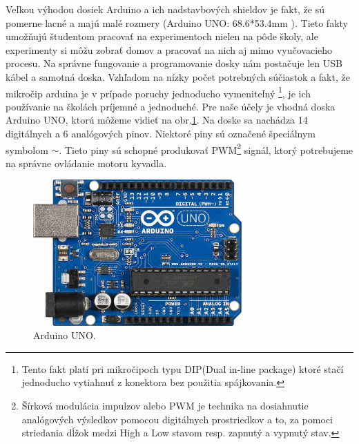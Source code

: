 \newpage
Veľkou výhodou dosiek Arduino a ich nadstavbových shieldov je fakt, že sú pomerne lacné a majú malé rozmery (Arduino UNO: 68.6*53.4mm\cite{UNO} ). Tieto fakty umožňujú študentom pracovať na experimentoch nielen na pôde školy, ale experimenty si môžu zobrať domov a pracovať na nich aj mimo vyučovacieho procesu. Na správne fungovanie a programovanie dosky nám postačuje len USB kábel a samotná doska. Vzhľadom na nízky počet potrebných súčiastok a fakt, že mikročip arduina je v prípade poruchy jednoducho vymeniteľný \footnote[2]{Tento fakt platí pri mikročipoch typu DIP(Dual in-line package) ktoré stačí jednoducho vytiahnuť z konektora bez použitia spájkovania.}, je ich používanie na školách príjemné a jednoduché. Pre naše účely je vhodná doska Arduino UNO, ktorú môžeme vidieť na obr.\ref{OBRAZOK 1.3}. Na doske sa nachádza 14 digitálnych a 6 analógových pinov. Niektoré piny sú označené špeciálnym symbolom $\sim$. Tieto piny sú schopné produkovať PWM\footnote[3]{Šírková modulácia impulzov alebo PWM je technika na dosiahnutie analógových výsledkov pomocou digitálnych prostriedkov a to, za pomoci striedania dĺžok medzi High a Low stavom resp. zapnutý a vypnutý stav.} signál, ktorý potrebujeme na správne ovládanie motoru kyvadla.

\begin{figure}[!tbh]
	\centering
	\includegraphics[width=80mm]{obr/arduino.jpg}
	\caption{{Arduino UNO.\cite{UNOFOTO}}}\label{OBRAZOK 1.3}
\end{figure}



